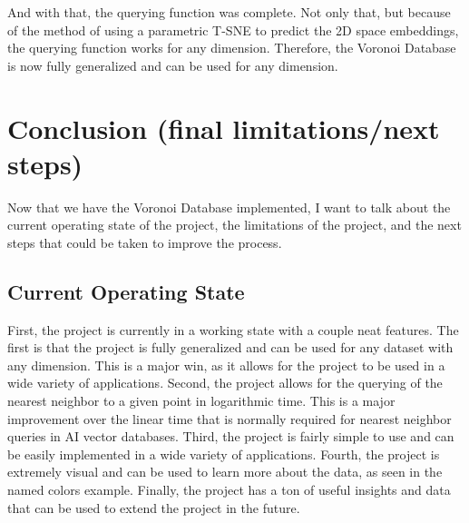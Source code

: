 \documentclass{article}
\begin{document}
\noindent
And with that, the querying function was complete. Not only that, but because of the method of using 
a parametric T-SNE to predict the 2D space embeddings, the querying function works for any dimension.
Therefore, the Voronoi Database is now fully generalized and can be used for any dimension.

\section{Conclusion (final limitations/next steps)}
Now that we have the Voronoi Database implemented, I want to talk about the current 
operating state of the project, the limitations of the project, and the next steps 
that could be taken to improve the process.

\subsection{Current Operating State}
First, the project is currently in a working state with a couple neat features.
The first is that the project is fully generalized and can be used for any dataset
with any dimension. This is a major win, as it allows for the project to be used
in a wide variety of applications. Second, the project allows for the querying of
the nearest neighbor to a given point in logarithmic time. This is a major improvement
over the linear time that is normally required for nearest neighbor queries in AI
vector databases. Third, the project is fairly simple to use and can be easily
implemented in a wide variety of applications. Fourth, the project is extremely
visual and can be used to learn more about the data, as seen in the named colors
example. Finally, the project has a ton of useful insights and data that can be 
used to extend the project in the future.
\end{document}
